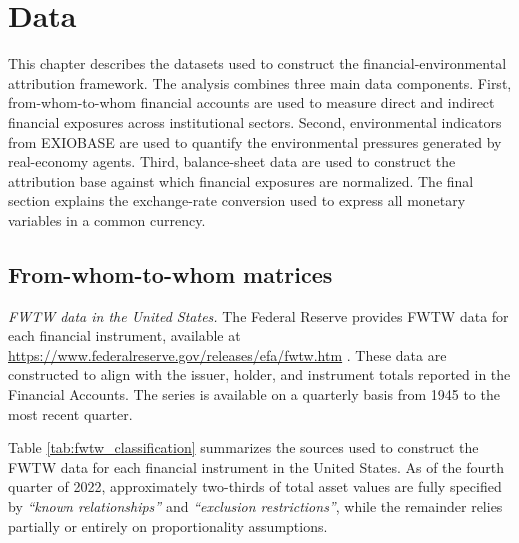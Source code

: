 \chapter{Data}
\label{Chapter4} %

This chapter describes the datasets used to construct the financial-environmental attribution framework. The analysis combines three main data components. First, from-whom-to-whom financial accounts are used to measure direct and indirect financial exposures across institutional sectors. Second, environmental indicators from EXIOBASE are used to quantify the environmental pressures generated by real-economy agents. Third, balance-sheet data are used to construct the attribution base against which financial exposures are normalized. The final section explains the exchange-rate conversion used to express all monetary variables in a common currency.

\section{From-whom-to-whom matrices}

\textit{FWTW data in the United States. } The Federal Reserve provides FWTW data for each financial instrument, available at \url{https://www.federalreserve.gov/releases/efa/fwtw.htm}
. These data are constructed to align with the issuer, holder, and instrument totals reported in the Financial Accounts. The series is available on a quarterly basis from 1945 to the most recent quarter. 

Table \ref{tab:fwtw_classification} summarizes the sources used to construct the FWTW data for each financial instrument in the United States. As of the fourth quarter of 2022, approximately two-thirds of total asset values are fully specified by \textit{“known relationships”} and \textit{“exclusion restrictions”}, while the remainder relies partially or entirely on proportionality assumptions.

